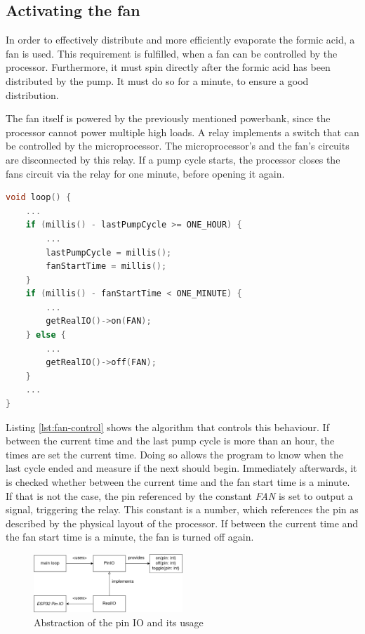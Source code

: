 \subsection{Activating the fan}\label{subsec:activating-the-fan}

In order to effectively distribute and more efficiently evaporate the formic acid, a fan is used.
This requirement is fulfilled, when a fan can be controlled by the processor.
Furthermore, it must spin directly after the formic acid has been distributed by the pump.
It must do so for a minute, to ensure a good distribution.

The fan itself is powered by the previously mentioned powerbank, since the processor cannot power multiple high loads.
A relay implements a switch that can be controlled by the microprocessor.
The microprocessor's and the fan's circuits are disconnected by this relay.
If a pump cycle starts, the processor closes the fans circuit via the relay for one minute, before opening it again.

\begin{lstlisting}[label={lst:fan-control},language=C++, caption=Controling the fan]
void loop() {
    ...
    if (millis() - lastPumpCycle >= ONE_HOUR) {
        ...
        lastPumpCycle = millis();
        fanStartTime = millis();
    }
    if (millis() - fanStartTime < ONE_MINUTE) {
        ...
        getRealIO()->on(FAN);
    } else {
        ...
        getRealIO()->off(FAN);
    }
    ...
}
\end{lstlisting}

Listing \ref{lst:fan-control} shows the algorithm that controls this behaviour.
If between the current time and the last pump cycle is more than an hour, the times are set the current time.
Doing so allows the program to know when the last cycle ended and measure if the next should begin.
Immediately afterwards, it is checked whether between the current time and the fan start time is a minute.
If that is not the case, the pin referenced by the constant \textit{FAN} is set to output a signal, triggering the relay.
This constant is a number, which references the pin as described by the physical layout of the processor.
If between the current time and the fan start time is a minute, the fan is turned off again.

\begin{figure}
    \centering
    \includegraphics[width=0.5\textwidth]{img/realio-interaction}
    \caption{Abstraction of the pin IO and its usage}
    \label{fig:abstraction-of-pinio}
\end{figure}

